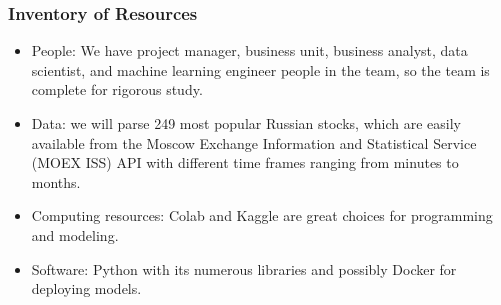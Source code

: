 \documentclass[oneside,final,12pt,a4paper]{extreport}
\begin{document}
\subsubsection{Inventory of Resources}
\begin{itemize}
    \item People: We have project manager, business unit, business analyst, data scientist, and machine learning engineer people in the team, so the team is complete for rigorous study.
    \item Data: we will parse 249 most popular Russian stocks, which are easily available from the Moscow Exchange Information and Statistical Service (MOEX ISS) API with different time frames ranging from minutes to months.
    \item Computing resources: Colab and Kaggle are great choices for programming and modeling.
    \item Software: Python with its numerous libraries and possibly Docker for deploying models.
\end{itemize}
\end{document}
